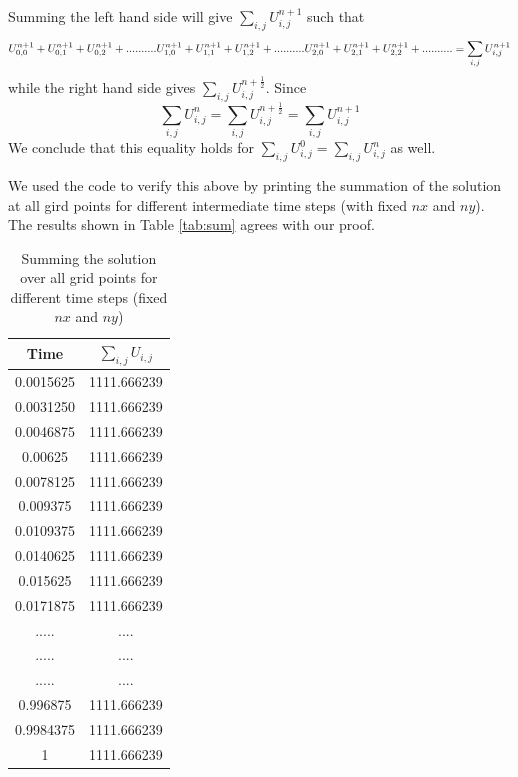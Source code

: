 Summing the left hand side will give $\sum_{i,j}U_{i,j}^{n+1}$ such that
$$
U_{0,0}^{n+1} + U_{0,1}^{n+1} + U_{0,2}^{n+1}+ ..........
U_{1,0}^{n+1} + U_{1,1}^{n+1} + U_{1,2}^{n+1}+ ..........
U_{2,0}^{n+1} + U_{2,1}^{n+1} + U_{2,2}^{n+1}+ ..........\\ = \sum	_{i,j}U_{i,j}^{n+1}
$$
while the right hand side gives $\sum_{i,j}U_{i,j}^{n+\frac{1}{2}}$. Since 
$$
\sum_{i,j}U_{i,j}^{n} = \sum_{i,j}U_{i,j}^{n+\frac{1}{2}} = \sum_{i,j}U_{i,j}^{n+1}
$$
We conclude that this equality holds for $\sum_{i,j}U_{i,j}^{0} = \sum_{i,j}U_{i,j}^{n}$ as well. 

We used the code to verify this above by printing the summation of the solution at all gird points for different intermediate time steps (with fixed $nx$ and $ny$). The results shown in Table \ref{tab:sum} agrees with our proof. 

\begin{table}[h!]
\centering
\begin{tabular}{|c|c|}
\hline
Time & $\sum_{i,j}U_{i,j}$  \\ 
\hline
0.0015625 & 1111.666239  \\ 
0.0031250 & 1111.666239  \\  
0.0046875 & 1111.666239  \\
0.00625 & 1111.666239  \\
0.0078125 & 1111.666239  \\
0.009375& 1111.666239  \\
0.0109375 & 1111.666239  \\
 0.0140625 & 1111.666239  \\
 0.015625 & 1111.666239  \\
0.0171875 & 1111.666239  \\
..... & ....  \\
..... & ....  \\
..... & ....  \\
0.996875 & 1111.666239  \\
0.9984375 & 1111.666239  \\
 1 & 1111.666239  \\
\end{tabular}
\caption{Summing the solution over all grid points for different time steps (fixed $nx$ and $ny$)}
\label{sum}
\end{table}